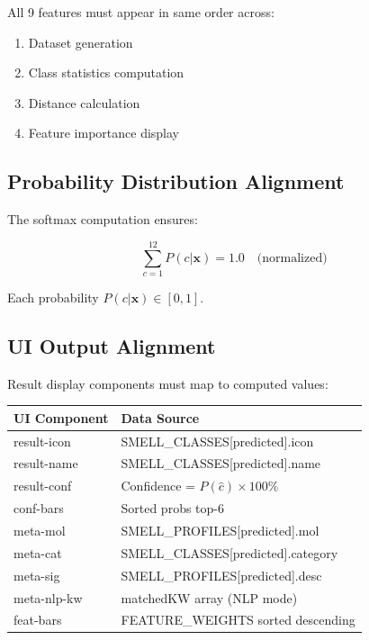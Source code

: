\documentclass[10pt]{article}
\begin{document}
{All 9 features must appear in same order across:
\begin{enumerate}
    \item Dataset generation
    \item Class statistics computation
    \item Distance calculation
    \item Feature importance display
\end{enumerate}

\subsection{Probability Distribution Alignment}

The softmax computation ensures:

\begin{equation}
\sum_{c=1}^{12} P(c|\mathbf{x}) = 1.0 \quad \text{(normalized)}
\end{equation}

Each probability $P(c|\mathbf{x}) \in [0, 1]$.

\subsection{UI Output Alignment}

Result display components must map to computed values:

\begin{table}[ht]
\centering
\begin{tabular}{|l|l|}
\hline
\textbf{UI Component} & \textbf{Data Source} \\
\hline
result-icon & SMELL\_CLASSES[predicted].icon \\
result-name & SMELL\_CLASSES[predicted].name \\
result-conf & Confidence = $P(\hat{c}) \times 100\%$ \\
conf-bars & Sorted probs top-6 \\
meta-mol & SMELL\_PROFILES[predicted].mol \\
meta-cat & SMELL\_CLASSES[predicted].category \\
meta-sig & SMELL\_PROFILES[predicted].desc \\
meta-nlp-kw & matchedKW array (NLP mode) \\
feat-bars & FEATURE\_WEIGHTS sorted descending \\
\hline
\end{tabular}
\end{table}

}
\end{document}
